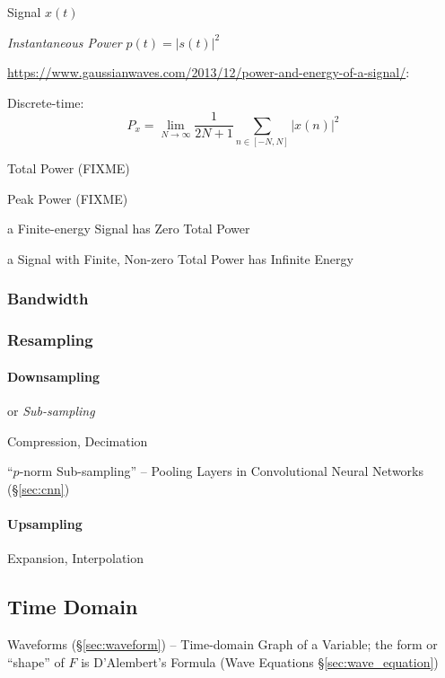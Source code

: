 Signal $x(t)$

\emph{Instantaneous Power} $p(t) = |s(t)|^2$

\url{https://www.gaussianwaves.com/2013/12/power-and-energy-of-a-signal/}:

Discrete-time:
\[
  P_x = \lim_{N\to\infty} \frac{1}{2N+1} \sum_{n \in [-N,N]}|x(n)|^2
\]

Total Power (FIXME)

Peak Power (FIXME)

a Finite-energy Signal has Zero Total Power

a Signal with Finite, Non-zero Total Power has Infinite Energy



\subsubsection{Bandwidth}\label{sec:bandwidth}

\subsubsection{Resampling}\label{sec:resampling}

\paragraph{Downsampling}\label{sec:downsampling}\hfill

or \emph{Sub-sampling}

Compression, Decimation

``$p$-norm Sub-sampling'' -- Pooling Layers in Convolutional Neural Networks
(\S\ref{sec:cnn})



\paragraph{Upsampling}\label{sec:upsampling}\hfill

Expansion, Interpolation



\subsection{Time Domain}\label{sec:time_domain}

Waveforms (\S\ref{sec:waveform}) -- Time-domain Graph of a Variable; the form or
``shape'' of $F$ is D'Alembert's Formula (Wave Equations
\S\ref{sec:wave_equation})

